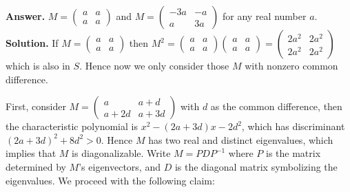 \documentclass[11pt,a4paper]{article}
\begin{document}
\begin{enumerate}
	\textbf{Answer.} $M=\begin{pmatrix}a&a\\a&a\end{pmatrix}$ and $M=\begin{pmatrix}-3a&-a\\a&3a\end{pmatrix}$ for any real number $a$. \\
	\textbf{Solution.} If $M=\begin{pmatrix}a&a\\a&a\end{pmatrix}$ then $M^2=\begin{pmatrix}a&a\\a&a\end{pmatrix}
	\begin{pmatrix}a&a\\a&a\end{pmatrix}
	=\begin{pmatrix}2a^2&2a^2\\2a^2&2a^2\end{pmatrix}
	$
	which is also in $S$. Hence now we only consider those $M$ with nonzero common difference. 
	
	First, consider $M=\begin{pmatrix}a&a+d\\a+2d&a+3d\end{pmatrix}$ with $d$ as the common difference, then the characteristic polynomial is $x^2-(2a+3d)x-2d^2$, which has discriminant $(2a+3d)^2+8d^2>0$. Hence $M$ has two real and distinct eigenvalues, which implies that $M$ is diagonalizable. Write $M=PDP^{-1}$ where $P$ is the matrix determined by $M$'s eigenvectors, and $D$ is the diagonal matrix symbolizing the eigenvalues. We proceed with the following claim: 
	

\end{enumerate}
\end{document}
